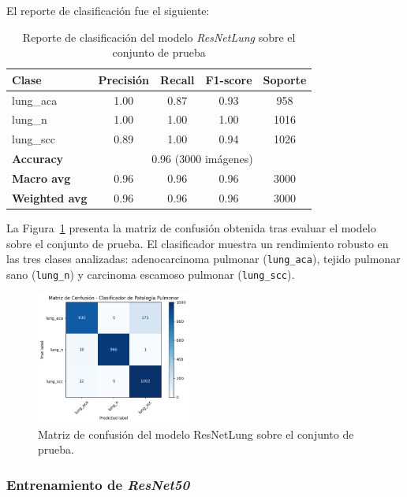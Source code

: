 \documentclass[conference]{IEEEtran}
\begin{document}
El reporte de clasificación fue el siguiente:

\begin{table}[ht]
\centering
\caption{Reporte de clasificación del modelo \textit{ResNetLung} sobre el conjunto de prueba}
\begin{tabular}{|l|c|c|c|c|}
\hline
\textbf{Clase} & \textbf{Precisión} & \textbf{Recall} & \textbf{F1-score} & \textbf{Soporte} \\
\hline
lung\_aca      & 1.00 & 0.87 & 0.93 & 958 \\
lung\_n        & 1.00 & 1.00 & 1.00 & 1016 \\
lung\_scc      & 0.89 & 1.00 & 0.94 & 1026 \\
\hline
\textbf{Accuracy} & \multicolumn{4}{c|}{0.96 (3000 imágenes)} \\
\textbf{Macro avg} & 0.96 & 0.96 & 0.96 & 3000 \\
\textbf{Weighted avg} & 0.96 & 0.96 & 0.96 & 3000 \\
\hline
\end{tabular}
\label{tab:clasresnetlung}
\end{table}

La Figura~\ref{fig:confmatrix} presenta la matriz de confusión obtenida tras evaluar el modelo sobre el conjunto de prueba. El clasificador muestra un rendimiento robusto en las tres clases analizadas: adenocarcinoma pulmonar (\texttt{lung\_aca}), tejido pulmonar sano (\texttt{lung\_n}) y carcinoma escamoso pulmonar (\texttt{lung\_scc}).

\begin{figure}[H]
\centering
\includegraphics[width=0.45\textwidth]{figs/confusion_matrix.png}
\caption{Matriz de confusión del modelo ResNetLung sobre el conjunto de prueba.}
\label{fig:confmatrix}
\end{figure}

\subsubsection{Entrenamiento de \textit{ResNet50}}
\end{document}
